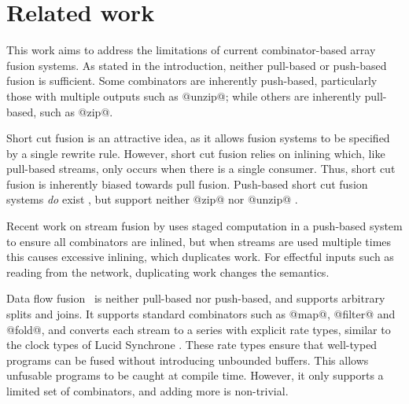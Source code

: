 \chapter{Related work}

This work aims to address the limitations of current combinator-based array fusion systems.
As stated in the introduction, neither pull-based or push-based fusion is sufficient.
Some combinators are inherently push-based, particularly those with multiple outputs such as @unzip@; while others are inherently pull-based, such as @zip@.

Short cut fusion is an attractive idea, as it allows fusion systems to be specified by a single rewrite rule.
However, short cut fusion relies on inlining which, like pull-based streams, only occurs when there is a single consumer.
Thus, short cut fusion is inherently biased towards pull fusion.
Push-based short cut fusion systems \emph{do} exist \cite{gill1993short}, but support neither @zip@ nor @unzip@ \cite{svenningsson2002shortcut,lippmeier2013data}.

Recent work on stream fusion by \citet{kiselyov2016stream} uses staged computation in a push-based system to ensure all combinators are inlined, but when streams are used multiple times this causes excessive inlining, which duplicates work.
For effectful inputs such as reading from the network, duplicating work changes the semantics.

Data flow fusion~\cite{lippmeier2013data} is neither pull-based nor push-based, and supports arbitrary splits and joins.
It supports standard combinators such as @map@, @filter@ and @fold@, and converts each stream to a series with explicit rate types, similar to the clock types of Lucid Synchrone \cite{benveniste2003synchronous}.
These rate types ensure that well-typed programs can be fused without introducing unbounded buffers.
This allows unfusable programs to be caught at compile time.
However, it only supports a limited set of combinators, and adding more is non-trivial.

